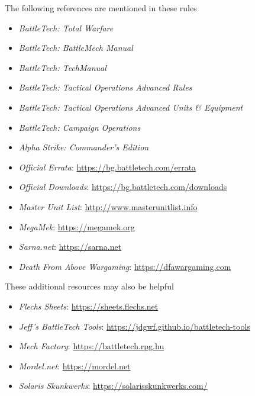 The following references are mentioned in these rules

\begin{itemize}

\item \emph{BattleTech: Total Warfare}

\item \emph{BattleTech: BattleMech Manual}

\item \emph{BattleTech: TechManual}

\item \emph{BattleTech: Tactical Operations Advanced Rules}

\item \emph{BattleTech: Tactical Operations Advanced Units \& Equipment}

\item \emph{BattleTech: Campaign Operations}

\item \emph{Alpha Strike: Commander's Edition}

\item \emph{Official Errata}: \href{https://bg.battletech.com/errata}{https://bg.battletech.com/errata}

\item \emph{Official Downloads}: \href{https://bg.battletech.com/downloads}{https://bg.battletech.com/downloads}

\item \emph{Master Unit List}: \href{http://www.masterunitlist.info}{http://www.masterunitlist.info}

\item \emph{MegaMek}: \href{https://megamek.org}{https://megamek.org}

\item \emph{Sarna.net}: \href{https://sarna.net}{https://sarna.net}

\item \emph{Death From Above Wargaming}: \href{https://dfawargaming.com}{https://dfawargaming.com}

\end{itemize}

These additional resources may also be helpful

\begin{itemize}

\item \emph{Flechs Sheets}: \href{https://sheets.flechs.net}{https://sheets.flechs.net}

\item \emph{Jeff's BattleTech Tools}: \href{https://jdgwf.github.io/battletech-tools}{https://jdgwf.github.io/battletech-tools}

\item \emph{Mech Factory}: \href{https://battletech.rpg.hu}{https://battletech.rpg.hu}

\item \emph{Mordel.net}: \href{https://mordel.net}{https://mordel.net}

\item \emph{Solaris Skunkwerks}: \href{https://solarisskunkwerks.com/}{https://solarisskunkwerks.com/}

\end{itemize}
